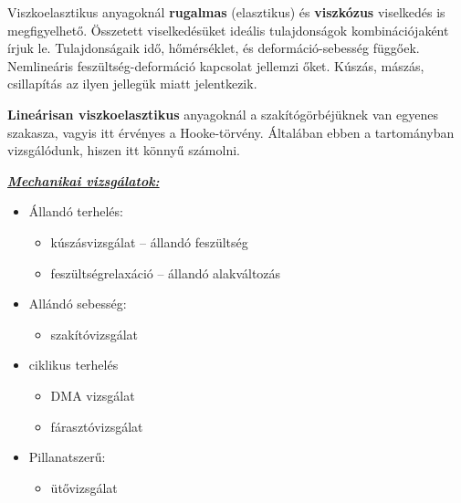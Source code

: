 \documentclass[12pt,a4paper]{article}       %
\newcounter{questionctr}
\newenvironment{question}[1]{
  \refstepcounter{questionctr}
  \begin{tcolorbox}[
    colback=gray!25,
    colbacktitle=red!10!yellow!50,
    enhanced,
    sharp corners,
    boxrule=0mm,
    frame hidden,
    breakable,
    enhanced jigsaw,
    title={\textcolor{black}{\textsc{\# \thequestionctr{} – #1}}}
  ]


}{\end{tcolorbox}}
\begin{document}
\begin{question}{
    Mit jelent az, hogy egy anyag viszkoelasztikus, illetve lineárisan
    viszkoelasztikus? Hogyan csoportosíthatók a különböző mechanikai
    vizsgálatok polimereknél a gerjesztés típusa szerint? Melyiknél mi a
    gerjesztés és milyen választ várunk rá?
  }
  Viszkoelasztikus anyagoknál \textbf{rugalmas} (elasztikus) és
  \textbf{viszkózus} viselkedés is megfigyelhető. Összetett viselkedésüket
  ideális tulajdonságok kombinációjaként írjuk le. Tulajdonságaik idő,
  hőmérséklet, és deformáció-sebesség függőek. Nemlineáris
  feszültség-deformáció kapcsolat jellemzi őket. Kúszás, mászás, csillapítás
  az ilyen jellegük miatt jelentkezik.
  \tcbline

  \textbf{Lineárisan viszkoelasztikus} anyagoknál a szakítógörbéjüknek van
  egyenes szakasza, vagyis itt érvényes a Hooke-törvény. Általában ebben a
  tartományban vizsgálódunk, hiszen itt könnyű számolni.
  \tcbline

  \underline{\textbf{\textit{Mechanikai vizsgálatok:}}}
  \begin{itemize}
    \item Állandó terhelés:
          \begin{itemize}
            \item kúszásvizsgálat – állandó feszültség
            \item feszültségrelaxáció – állandó alakváltozás
          \end{itemize}
    \item Allándó sebesség:
          \begin{itemize}
            \item szakítóvizsgálat
          \end{itemize}
    \item ciklikus terhelés
          \begin{itemize}
            \item DMA vizsgálat
            \item fárasztóvizsgálat
          \end{itemize}
    \item Pillanatszerű:
          \begin{itemize}
            \item ütővizsgálat
          \end{itemize}
  \end{itemize}
\end{question}
\end{document}
